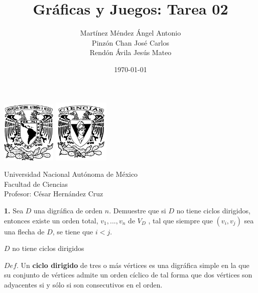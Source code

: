 \documentclass[12pt]{article}
\title{\textbf{Gráficas y Juegos: Tarea 02}}
\author{Martínez Méndez Ángel Antonio\\Pinzón Chan José Carlos\\Rendón Ávila Jesús Mateo}
\date{\today}
\begin{document}
\maketitle
\begin{center}
\vspace{3cm}
\includegraphics[width=0.195\textwidth]{Escudo.png}
\hspace{0.5cm}
\includegraphics[width=0.2\textwidth]{logo_ciencias.png}
\end{center}
\begin{center}
    \vspace{1cm}
    Universidad Nacional Autónoma de México\\
    Facultad de Ciencias\\
    Profesor: César Hernández Cruz\\
\end{center}

\newpage

%
%
\textbf{1.} Sea $D$ una digráfica de orden $n$. Demuestre que si $D$ no tiene ciclos dirigidos,
entonces existe un orden total, $v_1 , . . . , v_n$ de $V_D$ , tal que siempre que $(v_i , v_j)$ sea
una flecha de $D$, se tiene que $i < j$.\\

\begin{tcolorbox}[title=\textbf{Hipotesis}, colback=red!15!white, colframe=black!, breakable]
    $D$ no tiene ciclos dirigidos
\end{tcolorbox}

\begin{tcolorbox}[title=\textbf{Definiciones}, colback=blue!15!white, colframe=black!, breakable]
    $Def$. Un \textbf{ciclo dirigido} de tres o más vértices es una digráfica simple en la que su conjunto
    de vértices admite un orden cíclico de tal forma que dos vértices son adyacentes si y
    sólo si son consecutivos en el orden.
\end{tcolorbox}
\end{document}
